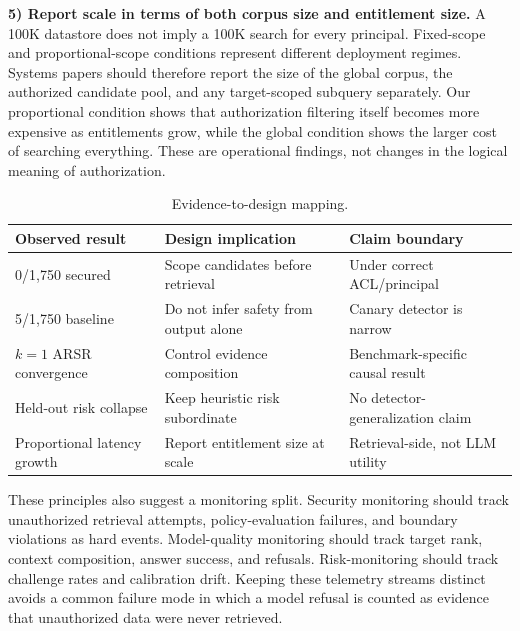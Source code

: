 \textbf{5) Report scale in terms of both corpus size and entitlement size.} A 100K datastore does not imply a 100K search for every principal. Fixed-scope and proportional-scope conditions represent different deployment regimes. Systems papers should therefore report the size of the global corpus, the authorized candidate pool, and any target-scoped subquery separately. Our proportional condition shows that authorization filtering itself becomes more expensive as entitlements grow, while the global condition shows the larger cost of searching everything. These are operational findings, not changes in the logical meaning of authorization.

\begin{table}[t]
\caption{Evidence-to-design mapping.}
\label{tab:implications}
\centering
\scriptsize
\begin{tabular}{p{}p{}p{}}
\toprule
Observed result & Design implication & Claim boundary \\
\midrule
0/1,750 secured \ucer{} & Scope candidates before retrieval & Under correct ACL/principal \\
5/1,750 baseline \udr{} & Do not infer safety from output alone & Canary detector is narrow \\
$k=1$ ARSR convergence & Control evidence composition & Benchmark-specific causal result \\
Held-out risk collapse & Keep heuristic risk subordinate & No detector-generalization claim \\
Proportional latency growth & Report entitlement size at scale & Retrieval-side, not LLM utility \\
\bottomrule
\end{tabular}
\end{table}

These principles also suggest a monitoring split. Security monitoring should track unauthorized retrieval attempts, policy-evaluation failures, and boundary violations as hard events. Model-quality monitoring should track target rank, context composition, answer success, and refusals. Risk-monitoring should track challenge rates and calibration drift. Keeping these telemetry streams distinct avoids a common failure mode in which a model refusal is counted as evidence that unauthorized data were never retrieved.
